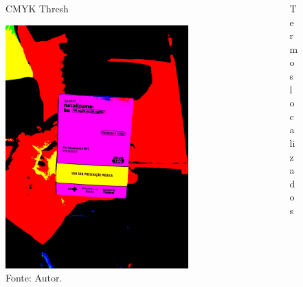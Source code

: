 \begin{frame}
	\begin{columns}
		\begin{column}{0.5\textwidth}
			\begin{figure}
				\caption*{CMYK Thresh}
				\includegraphics[width=0.85\textwidth]{../pictures/tysabri_cmyk_thresh.jpg}
				\caption*{Fonte: Autor.}
			\end{figure}
		\end{column}
		\begin{column}{0.5\textwidth}
			\begin{figure}
				\caption*{Termos localizados}

\end{figure}
\end{column}
\end{columns}
\end{frame}
